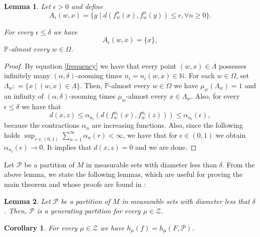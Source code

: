 \documentclass[12pt,a4paper]{amsart}
\theoremstyle{plain}
\newtheorem{lemma}{Lemma}
\newtheorem{corollary}{Corollary}
\begin{document}
	
	\begin{lemma}
		Let $\epsilon > 0$ and define
		\[
		A_{\epsilon}(w,x) = \{y \mid d(f^{n}_{w}(x),f^{n}_{w}(y)) \leq \epsilon, \forall n \geq 0\}.
		\]
		
		For every $\epsilon \leq \delta$ we have
		\[
		A_{\epsilon}(w,x) = \{x\},
		\]
		$\mathbb{P}$-almost every $w \in \Omega$.
	\end{lemma}
	\begin{proof}
		By equation \ref{frequency} we have that every point $(w,x) \in \Lambda$ possesses infinitely many $(\alpha,\delta)$-zooming times $n_{i} = n_{i}(w,x) \in \mathbb{N}$. For each $w \in \Omega$, set $\Lambda_{w} : = \{x \mid (w,x) \in \Lambda\}$. Then, $\mathbb{P}$-almost every $w \in \Omega$ we have $\mu_{w}(\Lambda_{w}) = 1$ and an infinity of $(\alpha,\delta)$-zooming times $\mu_{w}$-almost every $x \in \Lambda_{w}$. Also, for every $\epsilon \leq \delta$ we have that
		\[
		d(x,z) \leq \alpha_{n_{i}}(d(f^{n_{i}}_{w}(x),f^{n_{i}}_{w}(z))) \leq \alpha_{n_{i}}(\epsilon),
		\]
		because the contractions $\alpha_{n}$ are increasing functions. Also, since the following holds $\displaystyle \sup_{r \in (0,1)} \sum_{n=1}^{\infty}\alpha_{n}(r) < \infty$, we have that for $\epsilon \in (0,1)$ we obtain $\alpha_{n_{i}}(\epsilon) \to 0$. It implies that $d(x,z) = 0$ and we are done.
	\end{proof}
	
	Let $\mathcal{P}$ be a partition of $M$ in measurable sets with diameter less than $\delta$. From the above
	lemma, we state the following lemmas, which are useful for proving the main theorem and whose proofs are found in \cite{AMO}:
	
	\begin{lemma}\cite[Lemma 6.7]{AMO}
		\label{lemaparti}
		Let $\mathcal{P}$ be a partition of $M$ in measurable sets with diameter less that $\delta$. Then, $\mathcal{P}$ is a generating partition for every $\mu \in \mathcal{Z}$.
	\end{lemma}
	
	\begin{corollary}\cite[Lemma 6.8]{AMO}
		\label{corollary1}
		For every $\mu \in \mathcal{Z}$ we have $h_{\mu}(f) = h_{\mu}(F,\mathcal{P})$.
	\end{corollary}
	
\end{document}
